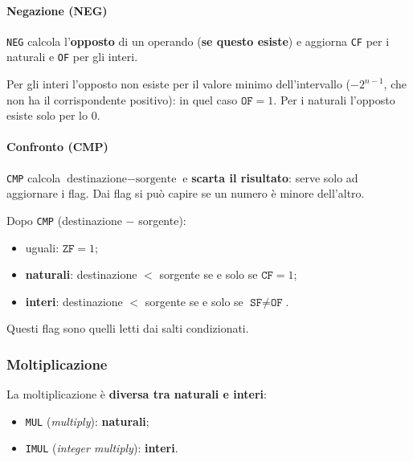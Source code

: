 \documentclass[11pt,a4paper]{article}
\begin{document}
\paragraph*{Negazione (NEG)}

\texttt{NEG} calcola l'\textbf{opposto} di un operando (\textbf{se questo esiste}) e aggiorna \texttt{CF} per i naturali e \texttt{OF} per gli interi.

\begin{integrazione}
Per gli interi l'opposto non esiste per il valore minimo dell'intervallo ($-2^{n-1}$, che non ha il corrispondente positivo): in quel caso $\texttt{OF}=1$. Per i naturali l'opposto esiste solo per lo 0.
\end{integrazione}

\paragraph*{Confronto (CMP)}

\texttt{CMP} calcola $\text{destinazione} - \text{sorgente}$ e \textbf{scarta il risultato}: serve solo ad aggiornare i flag. Dai flag si può capire se un numero è minore dell'altro.

\begin{integrazione}
Dopo \texttt{CMP} (destinazione $-$ sorgente):
\begin{itemize}[leftmargin=*]
  \item uguali: $\texttt{ZF}=1$;
  \item \textbf{naturali}: destinazione $<$ sorgente se e solo se $\texttt{CF}=1$;
  \item \textbf{interi}: destinazione $<$ sorgente se e solo se $\texttt{SF}\neq\texttt{OF}$.
\end{itemize}
Questi flag sono quelli letti dai salti condizionati.
\end{integrazione}

\subsubsection*{Moltiplicazione}

La moltiplicazione è \textbf{diversa tra naturali e interi}:
\begin{itemize}[leftmargin=*]
  \item \texttt{MUL} (\emph{multiply}): \textbf{naturali};
  \item \texttt{IMUL} (\emph{integer multiply}): \textbf{interi}.
\end{itemize}
\end{document}
